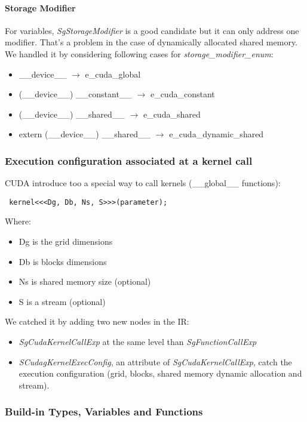 				\paragraph{Storage Modifier}	

For variables, \emph{SgStorageModifier} is a good candidate but it can only address one modifier. That's a problem in the case of dynamically allocated shared memory.
We handled it by considering following cases for \emph{storage\_modifier\_enum}:
		
\begin{itemize}
	\item \_\_device\_\_ $\rightarrow$ e\_cuda\_global
	\item (\_\_device\_\_) \_\_constant\_\_ $\rightarrow$ e\_cuda\_constant
	\item (\_\_device\_\_) \_\_shared\_\_ $\rightarrow$ e\_cuda\_shared
	\item extern (\_\_device\_\_) \_\_shared\_\_ $\rightarrow$ e\_cuda\_dynamic\_shared
\end{itemize}

			\subsubsection{Execution configuration associated at a kernel call}

CUDA introduce too a special way to call kernels (\_\_global\_\_ functions):
\begin{verbatim} kernel<<<Dg, Db, Ns, S>>>(parameter); \end{verbatim}
Where:
\begin{itemize}
	\item Dg is the grid dimensions
	\item Db is blocks dimensions
	\item Ns is shared memory size (optional)
	\item S is a stream (optional)
\end{itemize}
We catched it by adding two new nodes in the IR: 
\begin{itemize}
	\item \emph{SgCudaKernelCallExp} at the same level than \emph{SgFunctionCallExp}
	\item \emph{SCudagKernelExecConfig}, an attribute of \emph{SgCudaKernelCallExp}, catch the execution configuration (grid, blocks, shared memory dynamic allocation and stream).
\end{itemize}

			\subsubsection{Build-in Types, Variables and Functions}
			
